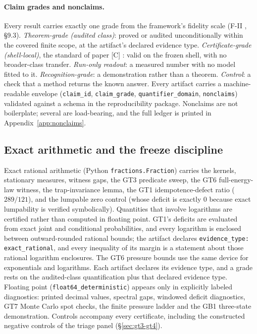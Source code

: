 \paragraph{Claim grades and nonclaims.} Every result carries exactly one grade from the
framework's fidelity scale (F-II , \S9.3).
\emph{Theorem-grade (audited class)}: proved or audited unconditionally within the covered finite
scope, at the artifact's declared evidence type. \emph{Certificate-grade (shell-local)}, the
standard of paper [C] : valid on the frozen shell, with no broader-class
transfer. \emph{Run-only readout}: a measured number with no model fitted to it.
\emph{Recognition-grade}: a demonstration rather than a theorem. \emph{Control}: a check that a
method returns the known answer. Every artifact carries a machine-readable envelope
(\texttt{claim\_id}, \texttt{claim\_grade}, \texttt{quantifier\_domain}, \texttt{nonclaims})
validated against a schema in the reproducibility package. Nonclaims are not boilerplate; several
are load-bearing, and the full ledger is printed in Appendix~\ref{app:nonclaims}.

\subsection{Exact arithmetic and the freeze discipline}

Exact rational arithmetic (Python \texttt{fractions.Fraction}) carries the kernels, stationary
measures, witness gaps, the GT3 predicate sweep, the GT6 full-energy-law witness, the
trap-invariance lemma, the GT1 idempotence-defect ratio ($289/121$), and the lumpable zero control
(whose deficit is exactly $0$ because exact lumpability is verified symbolically). Quantities that
involve logarithms are certified rather than computed in floating point. GT1's deficits are
evaluated from exact joint and conditional probabilities, and every logarithm is enclosed between
outward-rounded rational bounds; the artifact declares \texttt{evidence\_type:
exact\_rational}, and every inequality of its margin is a statement about those
rational logarithm enclosures. The GT6 pressure bounds use the same device for exponentials and
logarithms. Each artifact declares its evidence type, and a grade rests on the audited-class
quantification plus that declared evidence type. Floating point (\texttt{float64\_deterministic})
appears only in explicitly labeled diagnostics: printed decimal values, spectral gaps, windowed
deficit diagnostics, GT7 Monte Carlo spot checks, the finite pressure ladder and the GB1
three-state demonstration. Controls accompany every certificate, including the constructed
negative controls of the triage panel (\S\ref{sec:gt3-gt4}).

